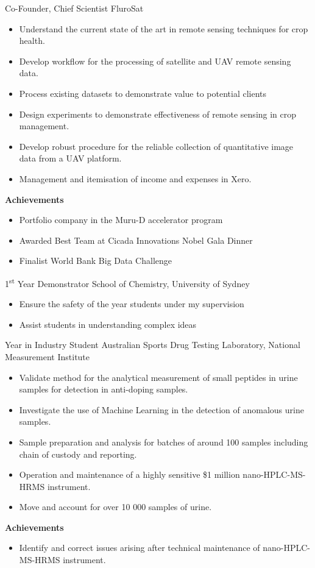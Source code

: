 {Co-Founder, Chief Scientist}
{FluroSat}{}{}
{%
  \begin{itemize}
    \item Understand the current state of the art in remote sensing techniques for crop health.
    \item Develop workflow for the processing of satellite and UAV remote sensing data.
    \item Process existing datasets to demonstrate value to potential clients
    \item Design experiments to demonstrate effectiveness of remote sensing in crop management.
    \item Develop robust procedure for the reliable collection of quantitative image data from a UAV platform.
    \item Management and itemisation of income and expenses in Xero.
  \end{itemize}
  \textbf{Achievements}
  \begin{itemize}
    \item Portfolio company in the Muru-D accelerator program
    \item Awarded Best Team at Cicada Innovations Nobel Gala Dinner
    \item Finalist World Bank Big Data Challenge
  \end{itemize}
}

{1\textsuperscript{st} Year Demonstrator}
{School of Chemistry, University of Sydney}
{}{}
{%
    \begin{itemize}
      \item Ensure the safety of the  year students under my supervision
      \item Assist students in understanding complex ideas
    \end{itemize}
}

{Year in Industry Student}
{Australian Sports Drug Testing Laboratory, National Measurement Institute}
{}{}
{%
  \begin{itemize}
    \item Validate method for the analytical measurement of small peptides in urine samples
      for detection in anti-doping samples.
    \item Investigate the use of Machine Learning in the detection of anomalous urine samples.
    \item Sample preparation and analysis for batches of around 100 samples including chain of custody and reporting.
    \item Operation and maintenance of a highly sensitive \$1 million nano-HPLC-MS-HRMS instrument.
    \item Move and account for over 10 000 samples of urine.
  \end{itemize}
  \textbf{Achievements}
  \begin{itemize}
    \item Identify and correct issues arising after technical maintenance of nano-HPLC-MS-HRMS instrument.
  \end{itemize}
}

